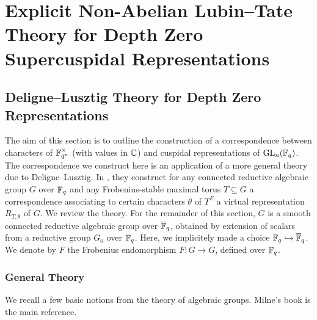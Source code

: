 \documentclass[../main.tex]{subfiles}
\begin{document}
\section{Explicit Non-Abelian Lubin--Tate Theory for Depth Zero Supercuspidal
Representations} %
\label{sec:Explicit Non-Abelian Lubin-Tate Theory for Depth Zero Supercuspidal Representations}

\subsection{Deligne--Lusztig Theory for Depth Zero Representations} %
\label{sub:Deligne-Lusztig Theory for Depth Zero Representations}
The aim of this section is to outline the construction of a correspondence
between characters of $\mathbb{F}_{q^n}^\times$ (with values in $\mathbb{C}$) and 
cuspidal representations of $\operatorname{GL}_n(\mathbb{F}_q)$. The correspondence we construct here
is an application of a more general theory due to Deligne--Lusztig. 
In \cite{delignelusztig1976}, they construct
for any connected reductive algebraic group $G$ over $\mathbb{F}_q$ and any
Frobenius-stable 
maximal torus $T \subseteq G$ a correspondence associating to certain
characters $\theta$ of $T^F$ a virtual representation $R_{T,\theta}$ of 
$G$. We review the theory. For the remainder of this section, $G$ is a smooth
connected reductive algebraic group over $\overline {\mathbb{F}}_q$, obtained by extension of 
scalars from a reductive group $G_0$ over $\mathbb{F}_q$. Here, we implicitely made a choice 
$\mathbb{F}_q \hookrightarrow \overline {\mathbb{F}}_q$. We denote by $F$ the Frobenius endomorphism
$F: G \to G$, defined over $\mathbb{F}_q$. 

\subsubsection{General Theory} %
\label{ssub:General Theory}

We recall a few basic notions from the theory of algebraic groups. Milne's book
\cite{milne2017reductive} is the main reference. 
\end{document}
